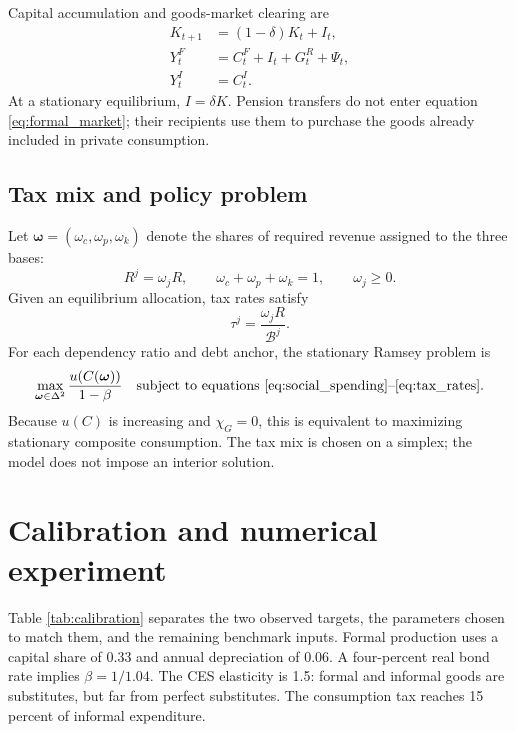\documentclass[12pt]{article}
\begin{document}
Capital accumulation and goods-market clearing are
\begin{align}
 K_{t+1}&=(1-\delta)K_t+I_t,                                 \label{eq:capital_law}\\
 Y_t^F&=C_t^F+I_t+G_t^R+\Psi_t,                              \label{eq:formal_market}\\
 Y_t^I&=C_t^I.                                               \label{eq:informal_market}
\end{align}
At a stationary equilibrium, $I=\delta K$. Pension transfers do not enter
equation \eqref{eq:formal_market}; their recipients use them to purchase the
goods already included in private consumption.

\subsection{Tax mix and policy problem}

Let $\boldsymbol{\omega}=(\omega_c,\omega_p,\omega_k)$ denote the shares of
required revenue assigned to the three bases:
\begin{equation}
  R^j=\omega_jR,
  \qquad
  \omega_c+\omega_p+\omega_k=1,
  \qquad
  \omega_j\geq0.
  \label{eq:tax_shares}
\end{equation}
Given an equilibrium allocation, tax rates satisfy
\begin{equation}
  \tau^j=\frac{\omega_jR}{\mathcal B^j}.
  \label{eq:tax_rates}
\end{equation}
For each dependency ratio and debt anchor, the stationary Ramsey problem is
\begin{equation}
 \max_{\boldsymbol{\omega}\in\Delta^2}
 \frac{u(C(\boldsymbol{\omega}))}{1-\beta}
 \quad
 \text{subject to equations \eqref{eq:social_spending}--\eqref{eq:tax_rates}.}
 \label{eq:ramsey_problem}
\end{equation}
Because $u(C)$ is increasing and $\chi_G=0$, this is equivalent to maximizing
stationary composite consumption. The tax mix is chosen on a simplex; the
model does not impose an interior solution.

\section{Calibration and numerical experiment}

Table \ref{tab:calibration} separates the two observed targets, the parameters
chosen to match them, and the remaining benchmark inputs. Formal production
uses a capital share of 0.33 and annual depreciation of 0.06. A four-percent
real bond rate implies $\beta=1/1.04$. The CES elasticity is 1.5: formal and
informal goods are substitutes, but far from perfect substitutes. The
consumption tax reaches 15 percent of informal expenditure.
\end{document}
